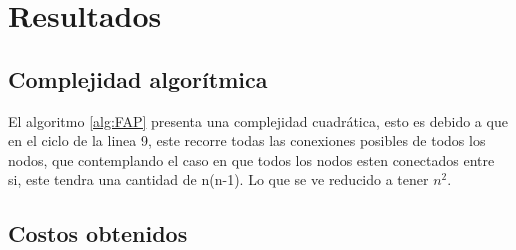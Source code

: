 \section{Resultados}

\subsection{Complejidad algorítmica}

El algoritmo \ref{alg:FAP} presenta una complejidad cuadrática, esto es debido a que en el ciclo de la linea 9, este recorre todas las conexiones posibles de todos los nodos, que contemplando el caso en que todos los nodos esten conectados entre si, este tendra una cantidad de n(n-1). Lo que se ve reducido a tener $n^2$.

\subsection{Costos obtenidos}

